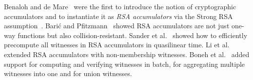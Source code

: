 \newcommand{\rsaPrecompFigure}{
\begin{figure*}[t]
{
    \normalsize
    \begin{center}
        \begin{forest}
        for tree={
            inner sep=4,
        }
        [{$g, \{e_1,\dots,e_8\}$}
            [{$g^{e_5 \cdots e_8}, \{e_1,\dots,e_4\}$}
                [{$g^{e_3 \cdots e_8}, \{e_1,e_2\}$}
                    [{$g^{e_2 \cdots e_8}, \{e_1\}$}
                        [, no edge, tier=odd ]
                    ]
                    [{$g^{e_1 e_3 \cdots e_8}, \{e_2\}$}
                        , tier=odd
                    ]
                ]
                [{$g^{e_1 e_2 e_5 \cdots e_8}, \{e_3,e_4\}$}
                    [{$g^{e_1 e_2 e_4 \cdots e_8}, \{e_3\}$}
                        [, no edge, tier=odd ]
                    ]
                    [{$g^{e_1 \cdots e_3, e_5 \cdots e_8}, \{e_4\}$}
                        , tier=odd
                    ]
                ]
            ]
            [{$g^{e_1 \cdots e_4}, \{e_5,\dots,e_8\}$}
                [{$g^{e_1 \cdots e_4 e_7 e_8}, \{e_5,e_6\}$}
                    [{$g^{e_1 \cdots e_4 e_6 \cdots e_8}, \{e_5\}$}
                        [, no edge, tier=odd ]
                    ]
                    [{$g^{e_1 \cdots e_5 e_7 e_8}, \{e_6\}$}
                        , tier=odd
                    ]
                ]
                [{$g^{e_1 \cdots e_6}, \{e_7,e_8\}$}
                    [{$g^{e_1 \cdots e_6 e_8}, \{e_7\}$}
                        [, no edge, tier=odd ]
                    ]
                    [{$g^{e_1 \cdots e_7}, \{e_8\}$}
                        , tier=odd
                    ]
                ]
            ]
        ]
        \end{forest}
    \end{center}
}
\caption{Divide-and-conquer approach by Sander et al.~\cite{SSY01} for precomputing $n$ membership witnesses for $T=\{e_1,\dots,e_n\}$ w.r.t. the RSA accumulator $\mathsf{acc}(T)$ in $\Theta(n\log{n})$ time. Here $n=8$.}
\label{f:rsa-acc-membproof-precomp}
\end{figure*}
}

Benaloh and de Mare~\cite{acc-rsa} were the first to introduce the notion of cryptographic accumulators and to instantiate it as \textit{RSA accumulators} via the Strong RSA assumption~\cite{BP97}.
Bari\'{c} and Pfitzmann~\cite{BP97} showed RSA accumulators are not just one-way functions but also collision-resistant.
Sander et al.~\cite{SSY01} showed how to efficiently precompute all witnesses in RSA accumulators in quasilinear time.
Li et al.~\cite{LLX07} extended RSA accumulators with non-membership witnesses.
Boneh et al.~\cite{BBF19} added support for computing and verifying witnesses in batch, for aggregating multiple witnesses into one and for union witnesses.

